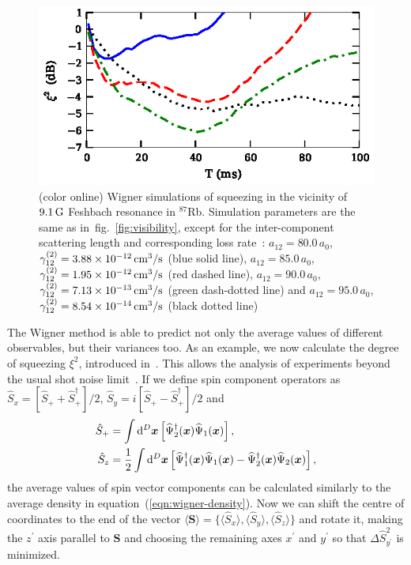 \documentclass[doublecol]{epl2}
\newcommand{\Rb}{$^{87}$Rb}
\newcommand{\figref}[1]{fig.~\ref{#1}}
\newcommand{\xvec}{\boldsymbol{x}}
\begin{document}
\begin{figure}
	\includegraphics[width=0.85\columnwidth]{ramsey_squeezing.eps}

	\caption[]{(color online)
	Wigner simulations of squeezing in the vicinity of $9.1\un{G}$ Feshbach resonance in \Rb.
	Simulation parameters are the same as in~\figref{fig:visibility},
	except for the inter-component scattering length and corresponding loss rate~\cite{Kaufman2009}:
	$a_{12} = 80.0\,a_0$, $\gamma^{(2)}_{12} = 3.88 \times 10^{-12}\un{cm^3/s}$ (blue solid line),
	$a_{12} = 85.0\,a_0$, $\gamma^{(2)}_{12} = 1.95 \times 10^{-12}\un{cm^3/s}$ (red dashed line),
	$a_{12} = 90.0\,a_0$, $\gamma^{(2)}_{12} = 7.13 \times 10^{-13}\un{cm^3/s}$ (green dash-dotted line) and
	$a_{12} = 95.0\,a_0$, $\gamma^{(2)}_{12} = 8.54 \times 10^{-14}\un{cm^3/s}$ (black dotted line)}

	\label{fig:squeezing}
\end{figure}

The Wigner method is able to predict not only the average values of different observables,
but their variances too.
As an example, we now calculate the degree of squeezing $\xi^2$, introduced in~\cite{Wineland1994,Sorensen2001}.
This allows the analysis of experiments beyond the usual shot noise limit~\cite{Riedel2010,Gross2010}.
If we define spin component operators as
$\hat{S}_{x} = [ \hat{S}_+ + \hat{S}_+^\dagger ] / 2 $,
$\hat{S}_{y} = i [ \hat{S}_+ - \hat{S}_+^\dagger ] / 2 $ and
\begin{equation}
\begin{split}
	\hat{S}_+ & = \int \upd^D\xvec \left[
		\widehat{\Psi}^\dagger_2 (\xvec) \widehat{\Psi}_1 (\xvec)
	\right], \\
	\hat{S}_z & = \frac{1}{2} \int \upd^D\xvec \left[
		\widehat{\Psi}^\dagger_1 (\xvec) \widehat{\Psi}_1 (\xvec)
		- \widehat{\Psi}^\dagger_2 (\xvec) \widehat{\Psi}_2 (\xvec)
	\right],
\end{split}
\end{equation}
the average values of spin vector components can be calculated similarly to the average density in
equation~(\ref{eqn:wigner-density}).
Now we can shift the centre of coordinates to the end of the vector
$\langle \boldsymbol{S} \rangle = \{ \langle \hat{S}_x \rangle, \langle \hat{S}_y \rangle, \langle \hat{S}_z \rangle \}$
and rotate it, making the $z^\prime$ axis parallel to $\boldsymbol{S}$ and choosing the remaining axes $x^\prime$ and $y^\prime$ so that
$\Delta \hat{S}^2_{y^\prime} $ is minimized.
\end{document}
